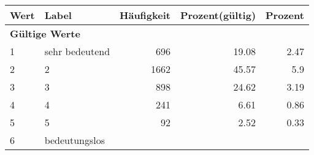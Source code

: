      \begin{longtable}{lXrrr}
     \toprule
     \textbf{Wert} & \textbf{Label} & \textbf{Häufigkeit} & \textbf{Prozent(gültig)} & \textbf{Prozent} \\
     \endhead
     \midrule
     \multicolumn{5}{l}{\textbf{Gültige Werte}}\\

     1 &
     \multicolumn{1}{X}{ sehr bedeutend   } &


       \num{696} &
       \num[round-mode=places,round-precision=2]{19,08} &
         \num[round-mode=places,round-precision=2]{2,47} \\

     2 &
     \multicolumn{1}{X}{ 2   } &


       \num{1662} &
       \num[round-mode=places,round-precision=2]{45,57} &
         \num[round-mode=places,round-precision=2]{5,9} \\

     3 &
     \multicolumn{1}{X}{ 3   } &


       \num{898} &
       \num[round-mode=places,round-precision=2]{24,62} &
         \num[round-mode=places,round-precision=2]{3,19} \\

     4 &
     \multicolumn{1}{X}{ 4   } &


       \num{241} &
       \num[round-mode=places,round-precision=2]{6,61} &
         \num[round-mode=places,round-precision=2]{0,86} \\

     5 &
     \multicolumn{1}{X}{ 5   } &


       \num{92} &
       \num[round-mode=places,round-precision=2]{2,52} &
         \num[round-mode=places,round-precision=2]{0,33} \\

     6 &
     \multicolumn{1}{X}{ bedeutungslos   } &



\end{longtable}
